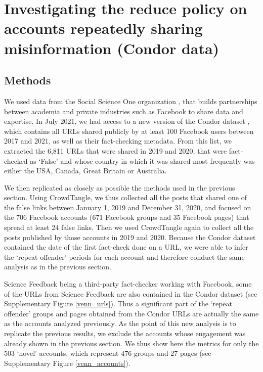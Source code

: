 \documentclass[review]{elsarticle}
\begin{document}
\section{Investigating the reduce policy on accounts repeatedly sharing misinformation (Condor data)}

\subsection{Methods}

We used data from the Social Science One organization \cite{king2020new}, that builds partnerships between academia and private industries such as Facebook to share data and expertise. 
In July 2021, we had access to a new version of the Condor dataset \cite{messing2020facebook}, which contains all URLs shared publicly by at least 100 Facebook users between 2017 and 2021, as well as their fact-checking metadata. 
From this list, we extracted the 6,811 URLs that were shared in 2019 and 2020, that were fact-checked as `False' and whose country in which it was shared most frequently was either the USA, Canada, Great Britain or Australia.

We then replicated as closely as possible the methods used in the previous section. 
Using CrowdTangle, we thus collected all the posts that shared one of the false links between January 1, 2019 and December 31, 2020, and focused on the 706 Facebook accounts (671 Facebook groups and 35 Facebook pages) that spread at least 24 false links. 
Then we used CrowdTangle again to collect all the posts published by those accounts in 2019 and 2020. 
Because the Condor dataset contained the date of the first fact-check done on a URL, we were able to infer the `repeat offender' periods for each account and therefore conduct the same analysis as in the previous section.

Science Feedback being a third-party fact-checker working with Facebook, some of the URLs from Science Feedback are also contained in the Condor dataset (see Supplementary Figure \ref{venn_urls}). 
Thus a significant part of the `repeat offender' groups and pages obtained from the Condor URLs are actually the same as the accounts analyzed previously. 
As the point of this new analysis is to replicate the previous results, we exclude the accounts whose engagement was already shown in the previous section. 
We thus show here the metrics for only the 503 `novel' accounts, which represent 476 groups and 27 pages (see Supplementary Figure \ref{venn_accounts}).
\end{document}
